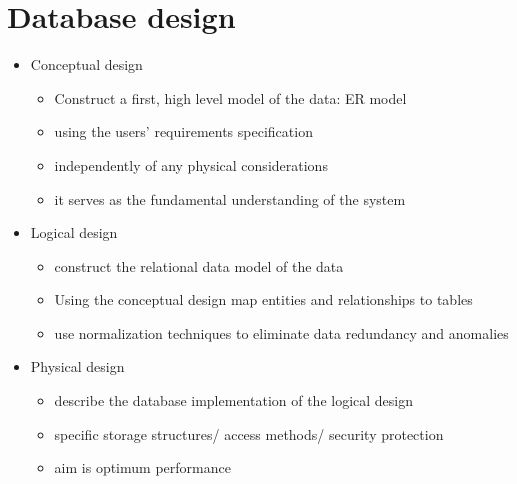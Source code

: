 \documentclass{article}[18pt]
\begin{document}
\section{Database design}
\begin{itemize}
	\item Conceptual design
	\begin{itemize}
		\item Construct a first, high level model of the data: ER model
		\item using the users' requirements specification
		\item independently of any physical considerations
		\item it serves as the fundamental understanding of the system
	\end{itemize}
	\item Logical design
	\begin{itemize}
		\item construct the relational data model of the data
		\item Using the conceptual design map entities and relationships to tables
		\item use normalization techniques to eliminate data redundancy and anomalies
	\end{itemize}
	\item Physical design
	\begin{itemize}
		\item describe the database implementation of the logical design
		\item specific storage structures/ access methods/ security protection
		\item aim is optimum performance
	\end{itemize}
\end{itemize}
\end{document}
